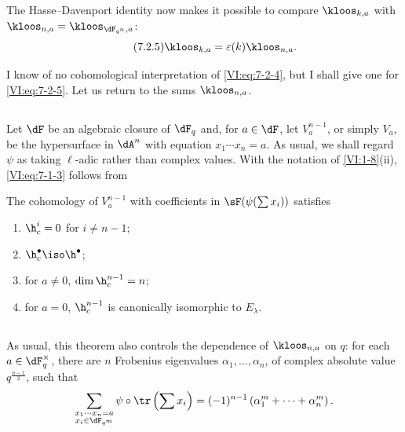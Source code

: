 \documentclass[oneside]{book}
\begin{document}
The Hasse--Davenport identity now makes it possible to compare $\kloos_{k,a}$ 
with $\kloos_{n,a} = \kloos_{\dF_{q^n},a}$: 
\begin{equation*}\tag{7.2.5}\label{VI:eq:7-2-5}
  \kloos_{k,a} = \varepsilon(k) \kloos_{n,a} \text{.} 
\end{equation*}

I know of no cohomological interpretation of \eqref{VI:eq:7-2-4}, but 
I shall give one for \eqref{VI:eq:7-2-5}. Let us return to the sums $\kloos_{n,a}$. 





\subsection{}\label{VI:7-3}

Let $\dF$ be an algebraic closure of $\dF_q$ and, for $a\in \dF$, let 
$V_a^{n-1}$, or simply $V_a$, be the hypersurface in $\dA^n$ with equation 
$x_1 \dotsm x_n=a$. As usual, we shall regard $\psi$ as taking 
$\ell$-adic rather than complex values. With the notation of 
\ref{VI:1-8}(ii), \eqref{VI:eq:7-1-3} follows from 





\begin{theorem_}\label{VI:7-4}
The cohomology of $V_a^{n-1}$ with coefficients in $\sF(\psi(\sum x_i))$ satisfies 
\begin{enumerate}[\indent (i)]
  \item $\h_c^i=0$ for $i\ne n-1$; 
  \item $\h_c^\bullet{} \iso \h^\bullet{}$; 
  \item for $a\ne 0$, $\dim \h_c^{n-1}{}=n$; 
  \item for $a=0$, $\h_c^{n-1}{}$ is canonically isomorphic to $E_\lambda$. 
\end{enumerate}
\end{theorem_}





\subsection{}\label{VI:7-5}

As usual, this theorem also controls the dependence of 
$\kloos_{n,a}$ on $q$: for each $a\in \dF_q^\times$, there are $n$ Frobenius 
eigenvalues $\alpha_1,\dots,\alpha_n$, of complex absolute value 
$q^{\frac{n-1}{2}}$, such that 
\[
  \sum_{\substack{x_1\dotsm x_n = a \\ x_i\in \dF_{q^m}}} \psi\circ \tr\left(\sum x_i\right) = (-1)^{n-1} \left(\alpha_1^m + \cdots + \alpha_n^m \right) \text{.} 
\]
\end{document}

